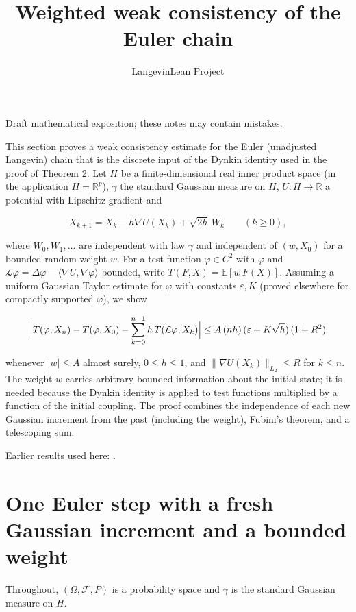 \documentclass[11pt,a4paper]{article}
\title{\texorpdfstring{Weighted weak consistency of the Euler chain}{Weighted weak consistency of the Euler chain}}
\author{LangevinLean Project}
\date{}
\begin{document}
\maketitle
Draft mathematical exposition; these notes may contain mistakes.


This section proves a weak consistency estimate for the Euler (unadjusted Langevin) chain that is the discrete input of the Dynkin identity used in the proof of Theorem 2. Let \(H\) be a finite-dimensional real inner product space (in the application \(H=\mathbb R^p\)), \(\gamma\) the standard Gaussian measure on \(H\), \(U:H\to\mathbb R\) a potential with Lipschitz gradient and


\[X_{k+1}=X_k-h\nabla U(X_k)+\sqrt{2h}\,W_k\qquad(k\ge0),\]


where \(W_0,W_1,\dots\) are independent with law \(\gamma\) and independent of \((w,X_0)\) for a bounded random weight \(w\). For a test function \(\varphi\in C^2\) with \(\varphi\) and \(\mathcal L\varphi=\Delta\varphi-\langle\nabla U,\nabla\varphi\rangle\) bounded, write \(T(F,X)=\mathbb E[w\,F(X)]\). Assuming a uniform Gaussian Taylor estimate for \(\varphi\) with constants \(\varepsilon,K\) (proved elsewhere for compactly supported \(\varphi\)), we show


\[\Bigl|T(\varphi,X_n)-T(\varphi,X_0)-\sum_{k=0}^{n-1}h\,T(\mathcal L\varphi,X_k)\Bigr|\le A\,(nh)\,(\varepsilon+K\sqrt h)\,(1+R^2)\]


whenever \(|w|\le A\) almost surely, \(0\le h\le1\), and \(\|\nabla U(X_k)\|_{L_2}\le R\) for \(k\le n\). The weight \(w\) carries arbitrary bounded information about the initial state; it is needed because the Dynkin identity is applied to test functions multiplied by a function of the initial coupling. The proof combines the independence of each new Gaussian increment from the past (including the weight), Fubini's theorem, and a telescoping sum.



Earlier results used here: \cite[Section~3.42]{LangevinLean2026ULASC}.

\section{\texorpdfstring{One Euler step with a fresh Gaussian increment and a bounded weight}{One Euler step with a fresh Gaussian increment and a bounded weight}}


Throughout, \((\Omega,\mathcal F,P)\) is a probability space and \(\gamma\) is the standard Gaussian measure on \(H\).
\end{document}
